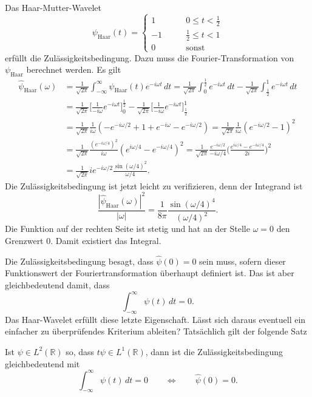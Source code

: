 \begin{beispiel}
Das Haar-Mutter-Wavelet
\[
\psi_{\text{Haar}}(t) = \begin{cases}
 1&\qquad 0\le t < \frac12\\
-1&\qquad \frac12 \le t < 1\\
 0&\qquad \text{sonst}
\end{cases}
\]
erfüllt die Zulässigkeitsbedingung.
Dazu muss die Fourier-Transformation von $\psi_{\text{Haar}}$ berechnet
werden.
Es gilt
\begin{align*}
\hat{\psi}_{\text{Haar}}(\omega)
&=
\frac{1}{\sqrt{2\pi}}
\int_{-\infty}^\infty \psi_{\text{Haar}}(t) e^{-i\omega t}\,dt
=
\frac{1}{\sqrt{2\pi}}
\int_0^{\frac12} e^{-i\omega t}\,dt
-
\frac1{\sqrt{2\pi}}
\int_{\frac12}^1e^{-i\omega t}\,dt
\\
&=
\frac1{\sqrt{2\pi}}
\biggl[\frac1{-i\omega}e^{-i\omega t} \biggr]_0^{\frac12}
-
\frac1{\sqrt{2\pi}}
\biggl[\frac1{-i\omega}e^{-i\omega t} \biggr]_{\frac12}^1
\\
&=
\frac{1}{\sqrt{2\pi}}
\frac{1}{i\omega}
(
-e^{-i\omega/2} + 1 + e^{-i\omega} - e^{-i\omega/2}
)
=
\frac{1}{\sqrt{2\pi}}
\frac{1}{i\omega}
( e^{-i\omega/2}-1)^2
\\
&=
\frac{1}{\sqrt{2\pi}}
\frac{(e^{-i\omega/4})^2}{i\omega}
( e^{i\omega/4} - e^{-i\omega/4})^2
=
\frac{1}{\sqrt{2\pi}}
\frac{e^{-i\omega/2}}{-i\omega/4}
\biggl(\frac{e^{i\omega/4}-e^{-i\omega/4}}{2i}\biggr)^2
\\
&=
\frac{1}{\sqrt{2\pi}}
ie^{-i\omega/2}
\frac{\sin(\omega/4)^2}{\omega/4}.
\end{align*}
Die Zulässigkeitsbedingung ist jetzt leicht zu verifizieren, denn
der Integrand ist
\[
\frac{|\hat{\psi}_{\text{Haar}}(\omega)|^2}{|\omega|}
=
\frac{1}{8\pi}\frac{\sin(\omega/4)^4}{(\omega/4)^2}.
\]
Die Funktion auf der rechten Seite ist stetig und hat an der Stelle $\omega=0$
den Grenzwert $0$.
Damit existiert das Integral.
\end{beispiel}


Die Zulässigkeitsbedingung besagt, dass $\hat{\psi}(0)=0$ sein muss,
sofern dieser Funktionswert der Fouriertransformation überhaupt
definiert ist.
Das ist aber gleichbedeutend damit, dass 
\[
\int_{-\infty}^\infty \psi(t)\,dt = 0.
\]
Das Haar-Wavelet erfüllt diese letzte Eigenschaft.
Lässt sich daraus eventuell ein einfacher zu überprüfendes Kriterium
ableiten?
Tatsächlich gilt der folgende Satz

\begin{satz}
\label{satz:zulaessigkeit}
Ist $\psi \in L^2(\mathbb R)$ so, dass $t\psi\in L^1(\mathbb R)$, dann
ist die Zulässigkeitsbedingung gleichbedeutend mit
\[
\int_{-\infty}^\infty \psi(t)\,dt = 0
\qquad\Leftrightarrow\qquad
\hat{\psi}(0)=0.
\]
\end{satz}

